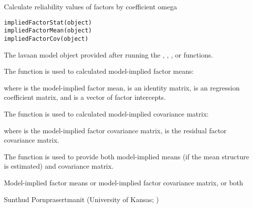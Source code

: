 \documentclass[a4paper]{book}
\begin{document}
%
\begin{Description}\relax
Calculate reliability values of factors by coefficient omega
\end{Description}
%
\begin{Usage}
\begin{verbatim}
impliedFactorStat(object)
impliedFactorMean(object)
impliedFactorCov(object)
\end{verbatim}
\end{Usage}
%
\begin{Arguments}
\begin{ldescription}
\item[\code{object}] The lavaan model object provided after running the , , , or  functions.
\end{ldescription}
\end{Arguments}
%
\begin{Details}\relax
The  function is used to calculated model-implied factor means:


where \eqn{\mu}{} is the model-implied factor mean,  is an identity matrix,  is an regression coefficient matrix, and \eqn{\alpha}{} is a vector of factor intercepts.

The  function is used to calculated model-implied covariance matrix:


where \eqn{\Phi}{} is the model-implied factor covariance matrix, \eqn{\Psi}{} is the residual factor covariance matrix.

The  function is used to provide both model-implied means (if the mean structure is estimated) and covariance matrix.
\end{Details}
%
\begin{Value}
Model-implied factor means or model-implied factor covariance matrix, or both
\end{Value}
%
\begin{Author}\relax
Sunthud Pornprasertmanit (University of Kansas; )
\end{Author}
\end{document}
